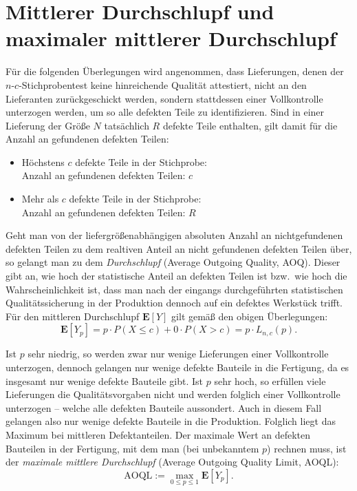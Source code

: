\documentclass[a4paper,11pt,oneside]{article}
\begin{document}
\section{Mittlerer Durchschlupf und maximaler mittlerer Durchschlupf}

Für die folgenden Überlegungen wird angenommen, dass Lieferungen, denen der $n$-$c$-Stichprobentest keine hinreichende Qualität attestiert, nicht an den Lieferanten zurückgeschickt werden, sondern stattdessen einer Vollkontrolle unterzogen werden, um so alle defekten Teile zu identifizieren. Sind in einer Lieferung der Größe $N$ tatsächlich $R$ defekte Teile enthalten, gilt damit für die Anzahl an gefundenen defekten Teilen:

\begin{itemize}
\item
Höchstens $c$ defekte Teile in der Stichprobe:\\
Anzahl an gefundenen defekten Teilen: $c$
\item
Mehr als $c$ defekte Teile in der Stichprobe:\\
Anzahl an gefundenen defekten Teilen: $R$
\end{itemize}

Geht man von der liefergrößenabhängigen absoluten Anzahl an nichtgefundenen defekten Teilen zu dem realtiven Anteil an nicht gefundenen defekten Teilen über, so gelangt man zu dem \emph{Durchschlupf} (Average Outgoing Quality, AOQ). Dieser gibt an, wie hoch der statistische Anteil an defekten Teilen ist bzw.\ wie hoch die Wahrscheinlichkeit ist, dass man nach der eingangs durchgeführten statistischen Qualitätssicherung in der Produktion dennoch auf ein defektes Werkstück trifft. Für den mittleren Durchschlupf $\mathbf{E}[Y]$ gilt gemäß den obigen Überlegungen:
$$
\mathbf{E}[Y_p]=
p\cdot P(X\le c) + 0\cdot P(X>c)=
p\cdot L_{n,c}(p).
$$

Ist $p$ sehr niedrig, so werden zwar nur wenige Lieferungen einer Vollkontrolle unterzogen, dennoch gelangen nur wenige defekte Bauteile in die Fertigung, da es insgesamt nur wenige defekte Bauteile gibt. Ist $p$ sehr hoch, so erfüllen viele Lieferungen die Qualitätsvorgaben nicht und werden folglich einer Vollkontrolle unterzogen -- welche alle defekten Bauteile aussondert. Auch in diesem Fall gelangen also nur wenige defekte Bauteile in die Produktion. Folglich liegt das Maximum bei mittleren Defektanteilen. Der maximale Wert an defekten Bauteilen in der Fertigung, mit dem man (bei unbekanntem $p$) rechnen muss, ist der \emph{maximale mittlere Durchschlupf} (Average Outgoing Quality Limit, AOQL):
$$
\mathrm{AOQL}:=
\max_{0\le p\le1} \mathbf{E}[Y_p].
$$
\end{document}

